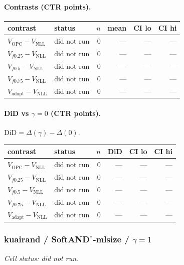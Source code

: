 \documentclass[10pt,a4paper]{article}
\begin{document}
\paragraph{Contrasts (CTR points).}
{\centering\small\begin{tabular}{llrrrr}
\toprule contrast & status & $n$ & mean & CI lo & CI hi \\
\midrule
$V_{\mathrm{OPC}}-V_{\mathrm{NLL}}$ & did not run & 0 & --- & --- & --- \\
$V_{f0.25}-V_{\mathrm{NLL}}$ & did not run & 0 & --- & --- & --- \\
$V_{f0.5}-V_{\mathrm{NLL}}$ & did not run & 0 & --- & --- & --- \\
$V_{f0.75}-V_{\mathrm{NLL}}$ & did not run & 0 & --- & --- & --- \\
$V_{\mathrm{adapt}}-V_{\mathrm{NLL}}$ & did not run & 0 & --- & --- & --- \\
\bottomrule\end{tabular}\par}
\paragraph{DiD vs $\gamma=0$ (CTR points).} $\mathrm{DiD}=\Delta(\gamma)-\Delta(0)$.
{\centering\small\begin{tabular}{llrrrr}
\toprule contrast & status & $n$ & DiD & CI lo & CI hi \\
\midrule
$V_{\mathrm{OPC}}-V_{\mathrm{NLL}}$ & did not run & 0 & --- & --- & --- \\
$V_{f0.25}-V_{\mathrm{NLL}}$ & did not run & 0 & --- & --- & --- \\
$V_{f0.5}-V_{\mathrm{NLL}}$ & did not run & 0 & --- & --- & --- \\
$V_{f0.75}-V_{\mathrm{NLL}}$ & did not run & 0 & --- & --- & --- \\
$V_{\mathrm{adapt}}-V_{\mathrm{NLL}}$ & did not run & 0 & --- & --- & --- \\
\bottomrule\end{tabular}\par}
\bigskip
\subsubsection{kuairand / SoftAND$^*$-mlsize / $\gamma=1$}
\emph{Cell status: did not run}.
\end{document}
